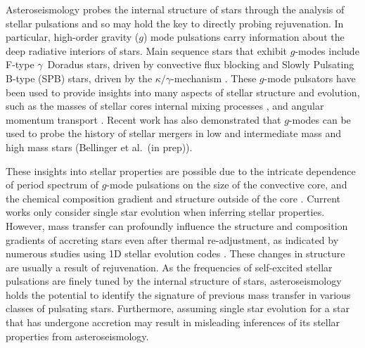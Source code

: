 \documentclass[twocolumn, twocolappendix, oneside]{aastex631}
\newcommand{\gmode}{$g$-mode\xspace}
\newcommand{\gmodes}{$g$-modes\xspace}
\begin{document}
Asteroseismology probes the internal structure of stars through the analysis of stellar pulsations \citep{Aerts+2010} and so may hold the key to directly probing rejuvenation. %
In particular, high-order gravity ($g$) mode pulsations carry information about the deep radiative interiors of stars. Main sequence stars that exhibit \gmodes include F-type $\gamma$~Doradus stars, driven by convective flux blocking \citep{Guzik+2000} and Slowly Pulsating B-type (SPB) stars, driven by the $\kappa/\gamma$-mechanism \citep{Waelkens+1985, Waelkens+1991, Cox+1992, Pamyatnykh+1999}.
These \gmode pulsators have been used to provide insights into many aspects of stellar structure and evolution, such as the masses of stellar cores \citep{Johnston+2021, Pedersen+2022} internal mixing processes \citep{Pedersen+2018,Michielsen+2021}, and angular momentum transport \citep{Aerts+2019,Burssens+2023,Mombarg2023}. Recent work has also demonstrated that \gmodes can be used to probe the history of stellar mergers in low and intermediate mass \citep{Rui+2021} and high mass stars (Bellinger et al.\ (in prep)).

These insights into stellar properties are possible due to the intricate dependence of period spectrum of \gmode pulsations on the size of the convective core, and the chemical composition gradient and structure outside of the core \citep[e.g.][]{Miglio+2008,Hatta+2023}. Current works only consider single star evolution when inferring stellar properties. However, mass transfer can profoundly influence the structure and composition gradients of accreting stars even after thermal re-adjustment, as indicated by numerous studies using 1D stellar evolution codes \citep{Cantiello+2007,Renzo+2021, Miszuda+2021}. These changes in structure are usually a result of rejuvenation. As the frequencies of self-excited stellar pulsations are finely tuned by the internal structure of stars, asteroseismology holds the potential to identify the signature of previous mass transfer in various classes of pulsating stars. Furthermore, assuming single star evolution for a star that has undergone accretion may result in misleading inferences of its stellar properties from asteroseismology.
\end{document}

